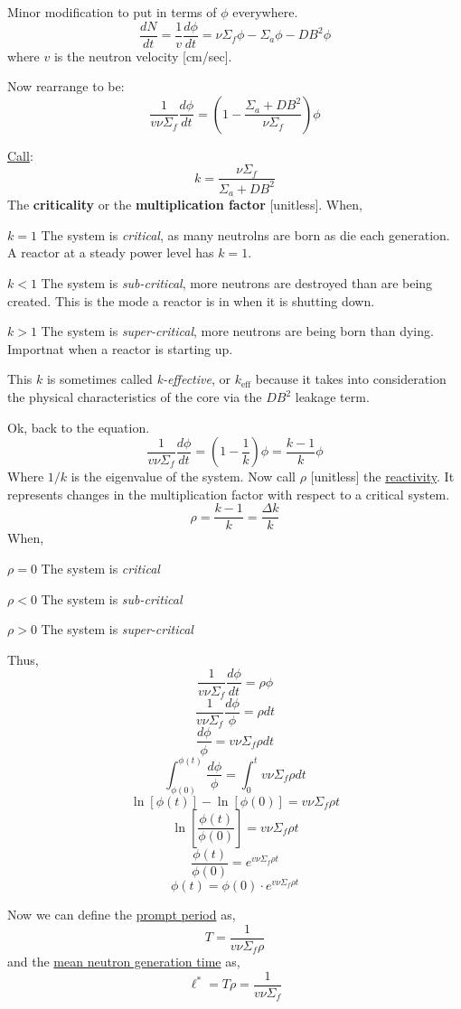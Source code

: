 Minor modification to put in terms of $\phi$ everywhere.
\[ \frac{dN}{dt} = \frac{1}{v}\frac{d\phi}{dt} = \nu\Sigma_f\phi - \Sigma_a\phi - DB^2\phi \]
where $v$ is the neutron velocity [cm/sec].

Now rearrange to be:
\[ \frac{1}{v\nu\Sigma_f}\frac{d\phi}{dt} = \left(1 - \frac{\Sigma_a + DB^2}{\nu\Sigma_f}\right)\phi \]

\underline{Call}:
\[ k = \frac{\nu\Sigma_f}{\Sigma_a + DB^2} \] The \textbf{criticality} or the \textbf{multiplication factor}
[unitless]. When,
\begin{labeling}
    \item [$k = 1$] The system is \textit{critical}, as many neutrolns are born as die each generation.
                    A reactor at a steady power level has $k=1$.
    \item [$k < 1$] The system is \textit{sub-critical}, more neutrons are destroyed than are being
                    created. This is the mode a reactor is in when it is shutting down.
    \item [$k > 1$] The system is \textit{super-critical}, more neutrons are being born than dying.
                    Importnat when a reactor is starting up.
\end{labeling}
This $k$ is sometimes called \textit{k-effective}, or $k_\mathrm{eff}$ because it takes into consideration the
physical characteristics of the core via the $DB^2$ leakage term.

Ok, back to the equation.
\[ \frac{1}{v \nu \Sigma_f} \frac{d\phi}{dt} = \left( 1 - \frac{1}{k}\right)\phi = \frac{k-1}{k}\phi \]
Where $1/k$ is the eigenvalue of the system. Now call $\rho$ [unitless] the \underline{reactivity}. It
represents changes in the multiplication factor with respect to a critical system.
\[ \rho = \frac{k-1}{k} = \frac{\Delta k}{k} \]
When,
\begin{labeling}
    \item [$\rho = 0$] The system is \textit{critical}
    \item [$\rho < 0$] The system is \textit{sub-critical}
    \item [$\rho > 0$] The system is \textit{super-critical}
\end{labeling}
Thus,
\[ \frac{1}{v\nu\Sigma_f}\frac{d\phi}{dt} = \rho\phi \]
\[ \frac{1}{v\nu\Sigma_f}\frac{d\phi}{\phi} = \rho dt \]
\[ \frac{d\phi}{\phi} = v\nu\Sigma_f \rho dt \]
\[ \int_{\phi(0)}^{\phi(t)} \frac{d\phi}{\phi} = \int_{0}^{t} v\nu\Sigma_f \rho dt \]
\[ \ln[\phi(t)] - \ln[\phi(0)] = v\nu\Sigma_f \rho t \]
\[ \ln\left[\frac{\phi(t)}{\phi(0)}\right] = v\nu\Sigma_f \rho t \]
\[ \frac{\phi(t)}{\phi(0)} = e^{v\nu\Sigma_f \rho t} \]
\[ \phi(t) = \phi(0)\cdot e^{v\nu\Sigma_f \rho t} \]  %

Now we can define the \underline{prompt period} as,
\[ T = \frac{1}{v\nu\Sigma_f \rho} \]
and the \underline{mean neutron generation time} as,
\[ \ell^* = T\rho = \frac{1}{v\nu\Sigma_f} \]

